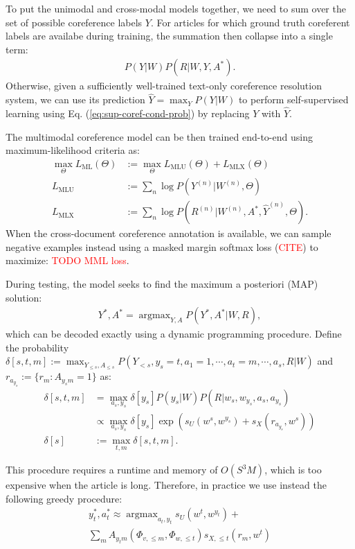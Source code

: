 \documentclass[11pt,a4paper]{article}
\DeclareMathOperator{\argmax}{argmax}
\begin{document}
To put the unimodal and cross-modal models together, we need to sum over the set of possible coreference labels $Y$. For articles for which ground truth coreferent labels are availabe
during training, the summation then collapse into a single term:
\begin{align}\label{eq:sup-coref-cond-prob}
    P(Y|W) P(R|W, Y, A^*).
\end{align}
Otherwise, given a sufficiently well-trained text-only coreference resolution system, we can use its prediction $\hat{Y}=\max_{Y} P(Y|W)$ to perform self-supervised learning using Eq. (\ref{eq:sup-coref-cond-prob}) by replacing $Y$ with $\hat{Y}$.

The multimodal coreference model can be then trained end-to-end using maximum-likelihood criteria as:
\begin{align}\label{eq:ml-criterion}
     \max_{\Theta} L_{\text{ML}}(\Theta) &:= \max_{\Theta} L_{\text{MLU}}(\Theta) + L_{\text{MLX}}(\Theta)\\
     L_{\text{MLU}} &:= \sum_{n}\log P(Y^{(n)}|W^{(n)}, \Theta)\\
     L_{\text{MLX}} &:= \sum_{n}\log P(R^{(n)}|W^{(n)}, A^*, \hat{Y}^{(n)}, \Theta).
\end{align}
 When the cross-document coreference annotation is available, we can sample negative examples instead using a masked margin softmax loss (\textcolor{red}{CITE}) to maximize:
\textcolor{red}{TODO MML loss}.
 
 During testing, the model seeks to find the maximum a posteriori (MAP) solution:
 \begin{align}\label{eq:map-decode}
     Y^*, A^* = \argmax_{Y, A} P(Y^*, A^*|W, R),
 \end{align}
 which can be decoded exactly using a dynamic programming procedure. Define the probability $\delta[s, t, m] := \max_{Y_{\leq s}, A_{\leq s}} P(Y_{< s}, y_s=t, a_1=1,\cdots, a_t=m, \cdots, a_s, R|W)$ and $r_{a_{y_s}} := \{r_m: A_{y_sm} = 1\}$ as:
\begin{align}\label{eq:map-decode-dp}
    \delta[s, t, m] &= \max_{a_s, y_s}  \delta[y_s] P(y_s|W) P(R|w_s, w_{y_s}, a_s, a_{y_s})\\
    		        &\propto \max_{a_s, y_s} \delta[y_s] \exp(s_U(w^s, w^{y_s}) + s_X(r_{a_{y_s}}, w^s))\\
    \delta[s] &:=  \max_{t, m}\delta[s, t, m].
 \end{align}

 This procedure requires a runtime and memory of $O(S^3 M)$, which is too expensive when the article is long. Therefore, in practice we use instead the following greedy procedure:
 \begin{multline}\label{eq:greedy-decode}
     y^*_t, a^*_t \approx  \argmax_{a_t, y_t}  s_U(w^t, w^{y_t}) + \\
     \sum_{m}A_{y_t m}(\Phi_{v, \leq m}, \Phi_{w, \leq t}) s_{X, \leq t}(r_m, w^t) 
 \end{multline}
\end{document}
